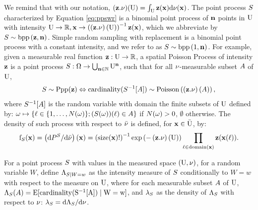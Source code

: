 We remind that with our notation, $(\mathbf{z}.\nu)(\mathrm{U})=\int_{\mathrm{U}} \mathbf{z}(\mathbf{x})\mathrm{d} \nu(\mathbf{x})$. The point process $S$ characterized by Equation \eqref{eq:ppswr} is a binomial point process of $\mathbf{n}$ points in $\mathrm{U}$ with intensity $\mathrm{U}\to\mathbb{R}, \mathbf{x}\to\left(\left(\mathbf{z}.\nu\right)\left(\mathrm{U}\right)\right)^{-1}\mathbf{z}(\mathbf{x})$, which we abbreviate by $S\sim\mathrm{bpp}\left(\mathbf{z},\mathbf{n}\right)$. Simple random sampling with replacement is a binomial point process with a constant intensity,  and we refer to as $S\sim\mathrm{bpp}\left(1,\mathbf{n}\right)$.  %
For example, given a measurable real function $\mathbf{z} :\mathrm{U} \to\mathbb{R}$, a spatial Poisson Process of intensity $\mathbf{z}$ is a point process 
$S:\Omega\to\bigcup_{\mathbf{n}\in\mathbb{N}}\mathrm{U}^{\mathbf{n}}$, such that 
for all $\nu$-measurable subset $A$ of $\mathrm{U}$, \begin{equation}\label{eq:poissonprocess}
S\sim\mathrm{Ppp}(\mathbf{z})\Leftrightarrow
\mathrm{cardinality}(S^{-1}[A])\sim \mathrm{Poisson}\left((\mathbf{z}.\nu)\left(A \right)\right),
\end{equation}
where $S^{-1}[A]$ is the random variable with domain the finite subsets of $\mathrm{U}$ defined by: $\omega\mapsto\{\ell\in\{1,\ldots,N(\omega)\};(S(\omega))(\ell)\in A\}$ if $N(\omega)>0$, $\emptyset$ otherwise. The density of such process with respect to $\bar{\nu}$ is defined, for $\mathbf{x}\in \bar{\mathrm{U}}$, by:
\begin{equation}
\mathrm{f}_{S}(\mathbf{x})=\left(\mathrm{d} P^{S}/\mathrm{d}\bar{\nu}\right)(\mathbf{x})=\left(\mathrm{size} (\mathbf{x})!\right)^{-1}\exp\left(-\left(\mathbf{z}.\nu\right)(\mathrm{U})\right)
\prod_{\ell\in\mathrm{domain}(\mathbf{x})}
\mathbf{z}(\mathbf{x}(\ell)).
\end{equation}

For a point process $S$ with values in the measured space $(\mathrm{U},\nu)$, for a random variable $W$, define $\Lambda_{S\mid W=w}$ as the intensity measure of $S$ conditionally to $W=w$ with respect to the measure on $\mathrm{U}$, where for each measurable subset $A$ of $\mathrm{U}$, $\Lambda_S(A)=\mathrm{E[\mathrm{cardinality}(S^{-1}[A])\mid W=w]}$, and $\lambda_S$ as the density of $\Lambda_S$ with respect to $\nu$: $\lambda_S=\mathrm{d}\Lambda_S/\mathrm{d}\nu$.


